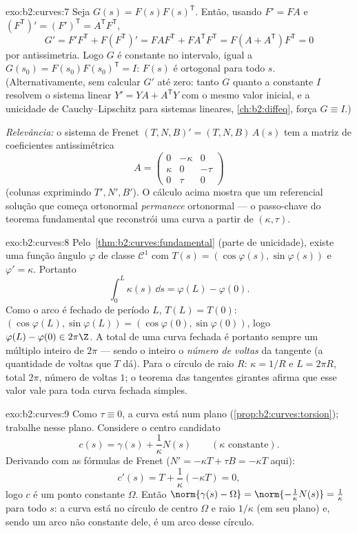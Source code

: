 \begin{solution}{exo:b2:curves:7}
Seja $G(s) = F(s)F(s)^{\mathsf T}$. Então, usando $F' = FA$ e
$(F^{\mathsf T})' = (F')^{\mathsf T} = A^{\mathsf T}F^{\mathsf T}$,
\[
G' = F'F^{\mathsf T} + F(F^{\mathsf T})'
= FAF^{\mathsf T} + FA^{\mathsf T}F^{\mathsf T}
= F(A + A^{\mathsf T})F^{\mathsf T} = 0
\]
por antissimetria. Logo $G$ é constante no intervalo, igual a
$G(s_0) = F(s_0)F(s_0)^{\mathsf T} = I$: $F(s)$ é ortogonal para
todo $s$. (Alternativamente, sem calcular $G'$ até zero: tanto
$G$ quanto a constante $I$ resolvem o sistema linear $Y' = YA +
A^{\mathsf T}Y$ com o mesmo valor inicial, e a unicidade de
Cauchy--Lipschitz para sistemas lineares, \cref{ch:b2:diffeq}, força $G
\equiv I$.)

\emph{Relevância:} o sistema de Frenet $(T, N, B)' = (T, N, B)\,A(s)$
tem a matriz de coeficientes antissimétrica
\[
A = \begin{pmatrix} 0 & -\kappa & 0\\ \kappa & 0 & -\tau\\
0 & \tau & 0\end{pmatrix}
\]
(colunas exprimindo $T', N', B'$). O cálculo acima mostra
que um referencial solução que começa ortonormal \emph{permanece}
ortonormal --- o passo-chave do teorema fundamental que
reconstrói uma curva a partir de $(\kappa, \tau)$.
\end{solution}

\begin{solution}{exo:b2:curves:8}
Pelo~\cref{thm:b2:curves:fundamental} (parte de unicidade), existe uma
função ângulo $\varphi$ de classe $\mathcal{C}^1$ com $T(s) =
(\cos\varphi(s), \sin\varphi(s))$ e $\varphi' = \kappa$. Portanto
\[
\int_0^L \kappa(s)\,\dd s = \varphi(L) - \varphi(0) .
\]
Como o arco é fechado de período $L$, $T(L) = T(0)$:
$(\cos\varphi(L), \sin\varphi(L)) = (\cos\varphi(0),
\sin\varphi(0))$, logo $\varphi(L) - \varphi(0) \in 2\pi\Z$. A
 total de uma curva fechada é portanto sempre um múltiplo
inteiro de $2\pi$ --- sendo o inteiro o \emph{número de voltas}
da tangente (a quantidade de voltas  que $T$ dá). Para o
círculo de raio $R$: $\kappa = 1/R$ e $L = 2\pi R$, 
total $2\pi$, número de voltas $1$; o teorema das tangentes
girantes afirma que esse valor vale para toda curva fechada simples.
\end{solution}

\begin{solution}{exo:b2:curves:9}
Como $\tau \equiv 0$, a curva está num plano
(\cref{prop:b2:curves:torsion}); trabalhe nesse plano. Considere o
centro candidato
\[
c(s) = \gamma(s) + \frac{1}{\kappa}N(s)
\qquad (\kappa \text{ constante}).
\]
Derivando com as fórmulas de Frenet ($N' = -\kappa T + \tau B
= -\kappa T$ aqui):
\[
c'(s) = T + \frac1\kappa(-\kappa T) = 0 ,
\]
logo $c$ é um ponto constante $\Omega$. Então $\norm{\gamma(s) -
\Omega} = \norm{-\frac1\kappa N(s)} = \frac1\kappa$ para todo $s$:
a curva está no círculo de centro $\Omega$ e raio
$1/\kappa$ (em seu plano) e, sendo um arco não constante dele,
é um arco desse círculo.
\end{solution}

